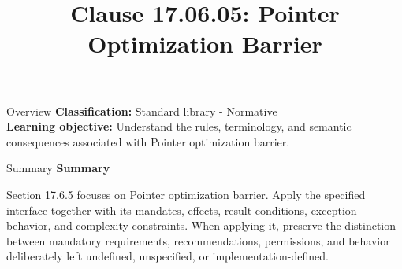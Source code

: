 \documentclass[10pt,letterpaper]{article}
\title{Clause 17.06.05: Pointer Optimization Barrier}
\author{}
\date{}
\begin{document}
\maketitle
\begin{CornellOverviewBox}{Overview}
\textbf{Classification:} Standard library - Normative\\[2pt]
\textbf{Learning objective:} Understand the rules, terminology, and semantic consequences associated with Pointer optimization barrier.
\end{CornellOverviewBox}\begin{CornellSummaryBox}{Summary}
{\sffamily\bfseries\color{Accent} Summary}\par\vspace{3pt}Section 17.6.5 focuses on Pointer optimization barrier. Apply the specified interface together with its mandates, effects, result conditions, exception behavior, and complexity constraints. When applying it, preserve the distinction between mandatory requirements, recommendations, permissions, and behavior deliberately left undefined, unspecified, or implementation-defined.
\end{CornellSummaryBox}
\end{document}

